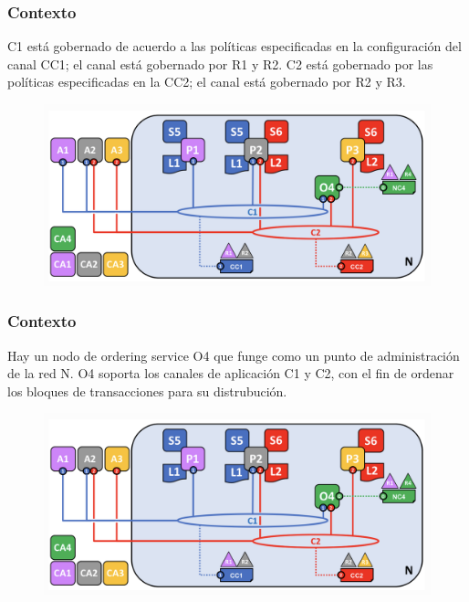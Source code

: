 \documentclass{beamer}
\begin{document}
	\begin{frame}
		\frametitle{Contexto}
		C1 está gobernado de acuerdo a las políticas especificadas en la configuración del canal CC1; el canal está gobernado por R1 y R2. C2 está gobernado por las políticas especificadas en la CC2; el canal está gobernado por R2 y R3.
		\begin{figure}[h]
			\includegraphics[scale=.3]{start_01}
			\centering
		\end{figure}
	\end{frame}

	\begin{frame}
		\frametitle{Contexto}
		Hay un nodo de ordering service O4 que funge como un punto de administración de la red N. O4 soporta los canales de aplicación C1 y C2, con el fin de ordenar los bloques de transacciones para su distrubución.
		\begin{figure}[h]
			\includegraphics[scale=.3]{start_01}
			\centering
		\end{figure}
	\end{frame}
\end{document}

